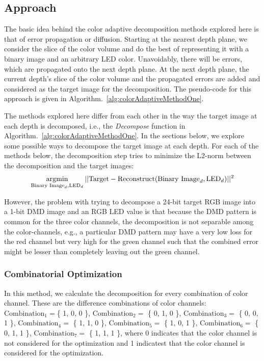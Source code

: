 \subsection{Approach}
The basic idea behind the color adaptive decomposition methods explored here is that of error propagation or diffusion. 
Starting at the nearest depth plane, we consider the slice of the color volume and do the best of representing it with a binary image and an arbitrary LED color. 
Unavoidably, there will be errors, which are propagated onto the next depth plane. 
At the next depth plane, the current depth's slice of the color volume and the propagated errors are added and considered as the target image for the decomposition.
The pseudo-code for this approach is given in Algorithm.~\ref{alg:colorAdaptiveMethodOne}. 


The methods explored here differ from each other in the way the target image at each depth is decomposed, i.e., the \emph{Decompose} function in Algorithm.~\ref{alg:colorAdaptiveMethodOne}.
In the sections below, we explore some possible ways to decompose the target image at each depth.
For each of the methods below, the decomposition step tries to minimize the L2-norm between the decomposition and the target images:
\begin{equation}
    \operatorname*{arg\!\min}_{\text{Binary Image}_d,\text{LED}_d} ||\text{Target} - \text{Reconstruct}(\text{Binary Image}_d, \text{LED}_d) ||^2
\end{equation}

However, the problem with trying to decompose a 24-bit target RGB image into a 1-bit DMD image and an RGB LED value is that because the DMD pattern is common for the three color channels, the decomposition is not separable among the color-channels, e.g., a particular DMD pattern may have a very low loss for the red channel but very high for the green channel such that the combined error might be lesser than completely leaving out the green channel. 

\subsubsection{Combinatorial Optimization}
\label{sec:acd:combinatorial}
In this method, we calculate the decomposition for every combination of color channel. 
These are the difference combinations of color channels: $\text{Combination}_1 = $\{ 1, 0, 0 \}, $\text{Combination}_2 = $ \{ 0, 1, 0 \}, $\text{Combination}_3 = $ \{ 0, 0, 1 \}, $\text{Combination}_4 = $ \{ 1, 1, 0 \}, $\text{Combination}_5 = $ \{ 1, 0, 1 \}, $\text{Combination}_6 = $ \{ 0, 1, 1 \}, $\text{Combination}_7 = $ \{ 1, 1, 1 \}, where 0 indicates that the color channel is not considered for the optimization and 1 indicatest that the color channel is considered for the optimization. 

